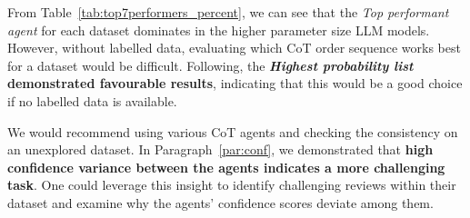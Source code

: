 \documentclass[11pt]{article}
\begin{document}



From Table~\ref{tab:top7performers_percent}, we can see that the \textit{Top performant agent} for each dataset dominates in the higher parameter size LLM models. However, without labelled data, evaluating which CoT order sequence works best for a dataset would be difficult. Following, the \textbf{\textit{Highest probability list} demonstrated favourable results}, indicating that this would be a good choice if no labelled data is available.

We would recommend using various CoT agents and checking the consistency on an unexplored dataset. In Paragraph~\ref{par:conf}, we demonstrated that \textbf{high confidence variance between the agents indicates a more challenging task}. One could leverage this insight to identify challenging reviews within their dataset and examine why the agents' confidence scores deviate among them.
\end{document}
